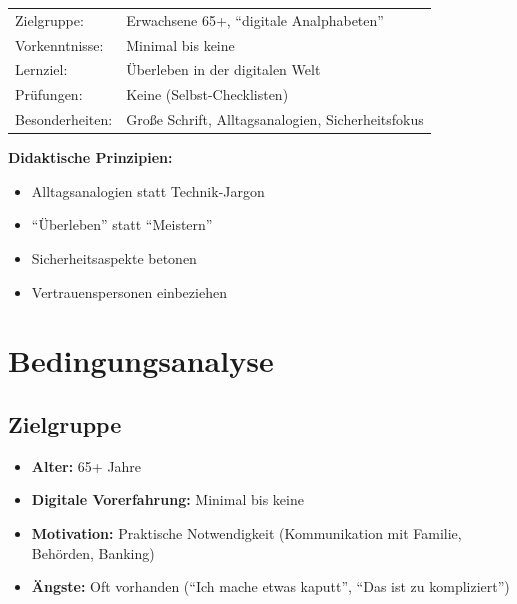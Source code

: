 \documentclass[11pt,a4paper]{article}
\begin{document}
\begin{infobox}
\begin{tabular}{ll}
    Zielgruppe: & Erwachsene 65+, ``digitale Analphabeten'' \\
    Vorkenntnisse: & Minimal bis keine \\
    Lernziel: & Überleben in der digitalen Welt \\
    Prüfungen: & Keine (Selbst-Checklisten) \\
    Besonderheiten: & Große Schrift, Alltagsanalogien, Sicherheitsfokus
\end{tabular}

\vspace{0.5em}
\textbf{Didaktische Prinzipien:}
\begin{itemize}[nosep]
    \item Alltagsanalogien statt Technik-Jargon
    \item ``Überleben'' statt ``Meistern''
    \item Sicherheitsaspekte betonen
    \item Vertrauenspersonen einbeziehen
\end{itemize}
\end{infobox}

\section{Bedingungsanalyse}

\subsection{Zielgruppe}
\begin{itemize}
    \item \textbf{Alter:} 65+ Jahre
    \item \textbf{Digitale Vorerfahrung:} Minimal bis keine
    \item \textbf{Motivation:} Praktische Notwendigkeit (Kommunikation mit Familie, Behörden, Banking)
    \item \textbf{Ängste:} Oft vorhanden (``Ich mache etwas kaputt'', ``Das ist zu kompliziert'')
\end{itemize}
\end{document}
